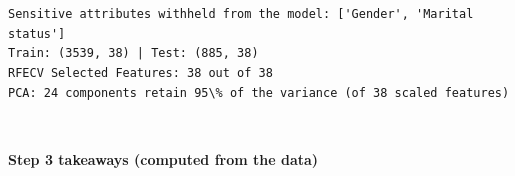 \documentclass[11pt]{article}
\begin{document}
    \begin{center}
    \end{center}
    { \hspace*{\fill} \\}
    
    \begin{Verbatim}[commandchars=\\\{\}]

Sensitive attributes withheld from the model: ['Gender', 'Marital status']
Train: (3539, 38) | Test: (885, 38)
RFECV Selected Features: 38 out of 38
PCA: 24 components retain 95\% of the variance (of 38 scaled features)
    \end{Verbatim}

    \begin{center}
    \end{center}
    { \hspace*{\fill} \\}
    
    \textbf{Step 3 takeaways (computed from the data)}
\end{document}
